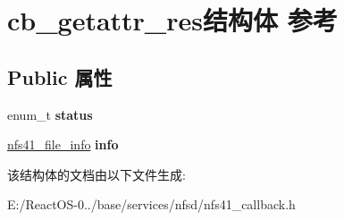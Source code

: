 \hypertarget{structcb__getattr__res}{}\section{cb\+\_\+getattr\+\_\+res结构体 参考}
\label{structcb__getattr__res}
\subsection*{Public 属性}
\begin{DoxyCompactItemize}
\item 
\mbox{\label{structcb__getattr__res_a7ea0557dd77488b665cbbc82afabd90f}} 
enum\+\_\+t {\bfseries status}
\item 
\mbox{\label{structcb__getattr__res_ad04de575fafeda8a92bfbcff969dbf59}} 
\hyperlink{struct____nfs41__file__info}{nfs41\+\_\+file\+\_\+info} {\bfseries info}
\end{DoxyCompactItemize}


该结构体的文档由以下文件生成\+:\begin{DoxyCompactItemize}
\item 
E\+:/\+React\+O\+S-\/0../base/services/nfsd/nfs41\+\_\+callback.\+h\end{DoxyCompactItemize}
